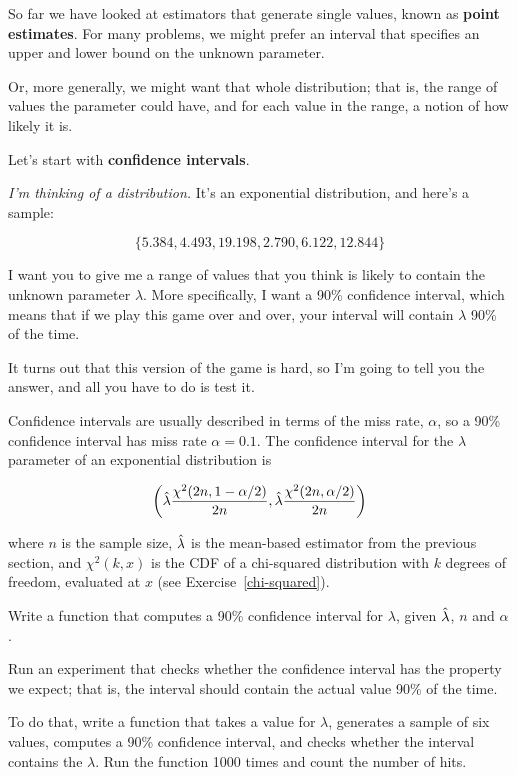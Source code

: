 \documentclass[12pt]{book}
\begin{document}
So far we have looked at estimators that generate single values, known
as {\bf point estimates}.  For many problems, we might prefer an interval
that specifies an upper and lower bound on the unknown parameter.

Or, more generally, we might want that whole distribution; that is,
the range of values the parameter could have, and for each value in
the range, a notion of how likely it is.

Let's start with {\bf confidence intervals}.

{\em I'm thinking of a distribution.}  It's an exponential distribution, and 
here's a sample:

\[ \{ 5.384, 4.493, 19.198, 2.790, 6.122, 12.844 \} \]

I want you to give me a range of values that you think is likely to
contain the unknown parameter $\lambda$.  More specifically, I want
a 90\% confidence interval, which means that if we play this game over
and over, your interval will contain $\lambda$ 90\% of the time.

It turns out that this version of the game is hard, so I'm going
to tell you the answer, and all you have to do is test it.

Confidence intervals are usually described in terms of the miss rate,
$\alpha$, so a 90\% confidence interval has miss rate $\alpha = 0.1$.
The confidence interval for the $\lambda$ parameter of an exponential
distribution is

\[ \left( \hat{\lambda} \frac{\chi^2(2n, 1-\alpha/2)}{2n},
      \hat{\lambda} \frac{\chi^2(2n, \alpha/2)}{2n} \right) \]

where $n$ is the sample size, $\hat{\lambda}$ is the mean-based estimator
from the previous section, and $\chi^2(k, x)$ is the CDF of a
chi-squared distribution with $k$ degrees of freedom, evaluated at $x$
(see Exercise~\ref{chi-squared}).

\begin{ex}
\label{expo_ci}

Write a function that computes a 90\% confidence interval for
$\lambda$, given $\hat{\lambda}$, $n$ and $\alpha$.

Run an experiment that checks whether the confidence interval has the
property we expect; that is, the interval should contain the actual
value 90\% of the time.

To do that, write a function that takes a value for $\lambda$,
generates a sample of six values, computes a 90\% confidence interval,
and checks whether the interval contains the $\lambda$.  Run the
function 1000 times and count the number of hits.

\end{ex}
\end{document}
